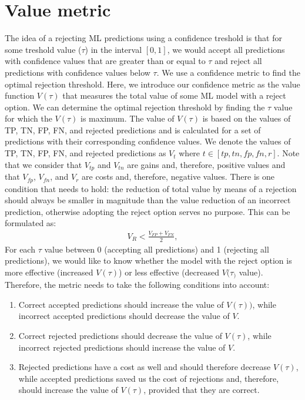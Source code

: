 \section{Value metric}
\label{sec:value-metric}
The idea of a rejecting ML predictions using a confidence treshold is that for some treshold value ($\tau$) in the interval $[0, 1]$, we would accept all predictions with confidence values that are greater than or equal to $\tau$ and reject all predictions with confidence values below $\tau$.
%
We use a confidence metric to find the optimal rejection threshold.
%
Here, we introduce our confidence metric as the value function $V(\tau)$ that measures the total value of some ML model with a reject option.
%
We can determine the optimal rejection threshold by finding the $\tau$ value for which the $V(\tau)$ is maximum.
%
The value of $V(\tau)$ is based on the values of TP, TN, FP, FN, and rejected predictions and is calculated for a set of predictions with their corresponding confidence values.
%
We denote the values of TP, TN, FP, FN, and rejected predictions as $V_t$ where $t \in [tp, tn, fp, fn, r]$.
%
Note that we consider that $V_{tp}$ and $V_{tn}$ are gains and, therefore, positive values and that $V_{fp}$, $V_{fn}$, and $V_{r}$ are costs and, therefore, negative values.
%
There is one condition that needs to hold: the reduction of total value by means of a rejection should always be smaller in magnitude than the value reduction of an incorrect prediction, otherwise adopting the reject option serves no purpose.
%
This can be formulated as:
% 
\begin{align}
    \label{for:value-condition}
    V_R < \frac{V_{FP} + V_{FN}}{2},
\end{align}
%
For each $\tau$ value between 0 (accepting all predictions) and 1 (rejecting all predictions), we would like to know whether the model with the reject option is more effective (increased $V(\tau)$) or less effective (decreased $V(\tau_)$ value).
%
Therefore, the metric needs to take the following conditions into account:
% 
\begin{enumerate}
    \item Correct accepted predictions should increase the value of $V(\tau))$, while incorrect accepted predictions should decrease the value of $V$.
    \item Correct rejected predictions should decrease the value of $V(\tau)$, while incorrect rejected predictions should increase the value of $V$.
    \item Rejected predictions have a cost as well and should therefore decrease $V(\tau)$, while accepted predictions saved us the cost of rejections and, therefore, should increase the value of $V(\tau)$, provided that they are correct.
\end{enumerate}
